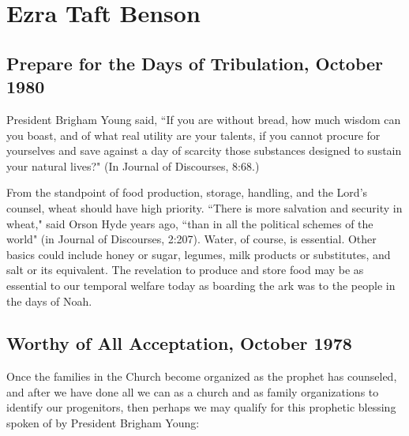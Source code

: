 \section{Ezra Taft Benson}

\subsection{Prepare for the Days of Tribulation, October 1980}

President Brigham Young said, ``If you are without bread, how much wisdom can you boast, and of what real utility are your talents, if you cannot procure for yourselves and save against a day of scarcity those substances designed to sustain your natural lives?" (In Journal of Discourses, 8:68.)

From the standpoint of food production, storage, handling, and the Lord’s counsel, wheat should have high priority. ``There is more salvation and security in wheat," said Orson Hyde years ago, ``than in all the political schemes of the world" (in Journal of Discourses, 2:207). Water, of course, is essential. Other basics could include honey or sugar, legumes, milk products or substitutes, and salt or its equivalent. The revelation to produce and store food may be as essential to our temporal welfare today as boarding the ark was to the people in the days of Noah.

\subsection{Worthy of All Acceptation, October 1978}

Once the families in the Church become organized as the prophet has counseled, and after we have done all we can as a church and as family organizations to identify our progenitors, then perhaps we may qualify for this prophetic blessing spoken of by President Brigham Young:


